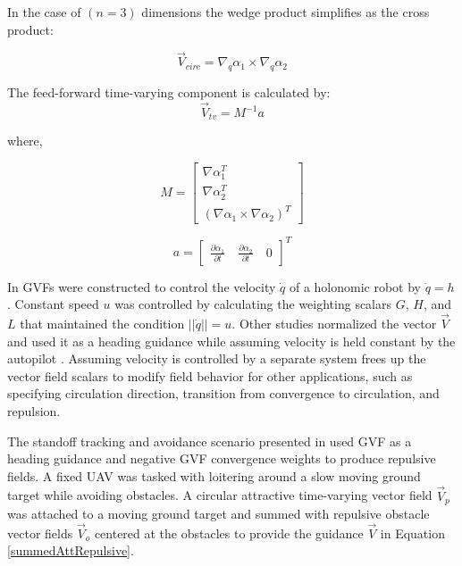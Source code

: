 \documentclass[numbered,pdftex]{ohio-etd}
\begin{document}
\noindent
In the case of $(n=3)$ dimensions the wedge product simplifies as the cross product:

\begin{equation}
\overrightarrow{V}_{circ} =  \nabla_q\alpha_1 \times \nabla_q\alpha_2 
\label{circOnlySimp}
\end{equation}

\noindent
The feed-forward time-varying component is calculated by:
\begin{equation}
\label{tv}
\overrightarrow{V}_{tv} = M^{-1}a
\end{equation}

\noindent
where,

\begin{equation}
\label{mMatrix}
M =\begin{bmatrix}
\nabla\alpha_1^T \\
\nabla\alpha_2^T \\
(\nabla\alpha_1 \times \nabla\alpha_2)^T
\end{bmatrix}
\end{equation}

\begin{equation}
\label{aVector}
a =\begin{bmatrix}
\frac{\partial \alpha_1}{\partial t} \quad   \frac{\partial \alpha_2}{\partial t} \quad   0
\end{bmatrix}^T
\end{equation}


In \cite{goncalves_artificial_2009,goncalves_circulation_2010,goncalves_vector_2010} GVFs were constructed to control the velocity $\dot{q}$ of a holonomic robot by $\dot{q}=h$. Constant speed  $u$ was controlled by calculating the weighting scalars $G$, $H$, and $L$ that maintained the condition $||\dot{q}|| = u$. Other studies normalized the vector $\overrightarrow{V}$ and used it as a heading guidance while assuming velocity is held constant by the autopilot \cite{gerlach_autonomous_2014,wilhelm_2019}. Assuming velocity is controlled by a separate system frees up the vector field scalars to modify field behavior for other applications, such as specifying circulation direction, transition from convergence to circulation, and repulsion. 
 
 
 The standoff tracking and avoidance scenario presented in \cite{wilhelm_2019} used GVF as a heading guidance and negative GVF convergence weights to produce repulsive fields. A fixed UAV was tasked with loitering around a slow moving ground target while avoiding obstacles. A circular attractive time-varying vector field $\overrightarrow{V}_{p}$ was attached to a moving ground target and summed with repulsive obstacle vector fields $\overrightarrow{V}_{o}$ centered at the obstacles to provide the guidance $\overrightarrow{V}$ in Equation \ref{summedAttRepulsive}. 
 
\end{document}
